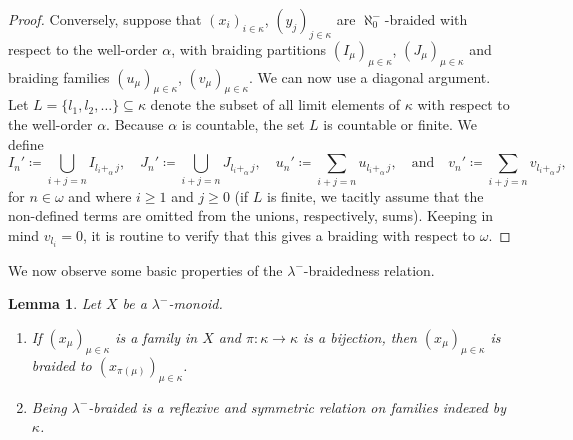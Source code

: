 \documentclass[a4paper,11pt,oneside]{amsart}
\newtheorem{lemma}[teor]{Lemma}
\theoremstyle{remark}
\begin{document}
\begin{proof}
  Conversely, suppose that $(x_i)_{i \in \kappa}$, $(y_j)_{j \in \kappa}$ are $\aleph_0^-$-braided with respect to the well-order $\alpha$, with braiding partitions $(I_\mu)_{\mu \in \kappa}$, $(J_\mu)_{\mu \in \kappa}$ and braiding families $(u_\mu)_{\mu \in \kappa}$, $(v_\mu)_{\mu \in \kappa}$.
  We can now use a diagonal argument.
  Let $L=\{l_1, l_2, \ldots\} \subseteq \kappa$ denote the subset of all limit elements of $\kappa$ with respect to the well-order $\alpha$.
  Because $\alpha$ is countable, the set $L$ is countable or finite.
  We define
  \[
    I_n' \coloneqq \bigcup_{i+j=n} I_{l_i +_\alpha\, j}, \quad J_n' \coloneqq \bigcup_{i+j=n} J_{l_i+_\alpha\, j}, \quad u_n' \coloneqq \sum_{i+j=n} u_{l_i+_\alpha\, j}, \quad \text{and} \quad v_n'\coloneqq\sum_{i+j=n} v_{l_i+_\alpha\, j},
  \]
  for $n \in \omega$ and where $i \ge 1$ and $j \ge 0$ (if $L$ is finite, we tacitly assume that the non-defined terms are omitted from the unions, respectively, sums).
  Keeping in mind $v_{l_i}=0$, it is routine to verify that this gives a braiding with respect to $\omega$.
\end{proof}

We now observe some basic properties of the $\lambda^-$-braidedness relation.

\begin{lemma} \label{l:braiding-basic}
  Let $X$ be a $\lambda^-$-monoid.
  \begin{enumerate}
  \item \label{b-basic:commutative} If $(x_\mu)_{\mu \in \kappa}$ is a family in $X$ and $\pi\colon \kappa\to\kappa$ is a bijection, then $(x_\mu)_{\mu \in \kappa}$ is braided to $(x_{\pi(\mu)})_{\mu \in \kappa}$.
  \item \label{b-basic:refsym} Being $\lambda^-$-braided is a reflexive and symmetric relation on families indexed by $\kappa$.
  \end{enumerate}
\end{lemma}
\end{document}
